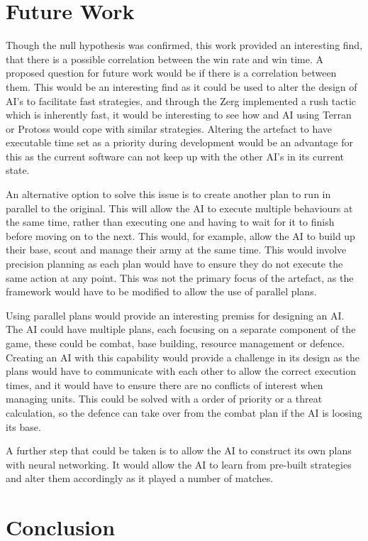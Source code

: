 \documentclass[journal]{IEEEtran}
\begin{document}
\section{Future Work}
Though the null hypothesis was confirmed, this work provided an interesting find, that there is a possible correlation between the win rate and win time. A proposed question for future work would be if there is a correlation between them. This would be an interesting find as it could be used to alter the design of AI's to facilitate fast strategies, and through the Zerg implemented a rush tactic which is inherently fast, it would be interesting to see how and AI using Terran or Protoss would cope with similar strategies.
Altering the artefact to have executable time set as a priority during development would be an advantage for this as the current software can not keep up with the other AI's in its current state.

An alternative option to solve this issue is to create another plan to run in parallel to the original. This will allow the AI to execute multiple behaviours at the same time, rather than executing one and having to wait for it to finish before moving on to the next. This would, for example, allow the AI to build up their base, scout and manage their army at the same time. This would involve precision planning as each plan would have to ensure they do not execute the same action at any point. This was not the primary focus of the artefact, as the framework would have to be modified to allow the use of parallel plans.

Using parallel plans would provide an interesting premiss for designing an AI. The AI could have multiple plans, each focusing on a separate component of the game, these could be combat, base building, resource management or defence. Creating an AI with this capability would provide a challenge in its design as the plans would have to communicate with each other to allow the correct execution times, and it would have to ensure there are no conflicts of interest when managing units. This could be solved with a order of priority or a threat calculation, so the defence can take over from the combat plan if the AI is loosing its base.

A further step that could be taken is to allow the AI to construct its own plans with neural networking. It would allow the AI to learn from pre-built strategies and alter them accordingly as it played a number of matches.

\section{Conclusion}
\end{document}
